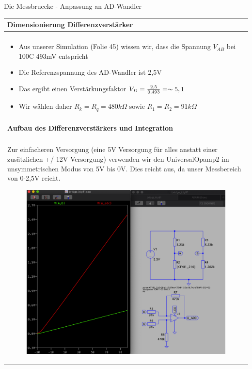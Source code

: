 \begin{frame}[t]{Die Messbruecke - Anpassung an AD-Wandler}

    \begin{spacing}{0.9} \begin{tiny}
            \begin{table}[h!]
                \begin{tabular}{p{10cm} }
                    \hline
                    \textbf{Dimensionierung Differenzverstärker}             \\
                    \hline                                                   \\
                    \begin{minipage}{\textwidth}
                        \begin{itemize}
                            \item Aus unserer Simulation (Folie 45) wissen wir, dass die Spannung $V_{AB}$ bei 100C 493mV entspricht
                            \item Die Referenzspannung des AD-Wandler ist 2,5V
                            \item Das ergibt einen Verstärkungsfaktor $V_D=\frac{2,5}{0,493}=\thicksim 5,1$
                            \item Wir wählen daher $R_k=R_q=480k\Omega$ sowie $R_1=R_2=91k\Omega$
                        \end{itemize}
                    \end{minipage}
                    \\\\
                    \hline
                    \textbf{Aufbau des Differenzverstärkers und Integration} \\
                    \hline                                                   \\
                    \begin{minipage}{\textwidth}
                        Zur einfacheren Versorgung (eine 5V Versorgung für alles anstatt einer zusätzlichen +/-12V Versorgung)
                        verwenden wir den UniversalOpamp2 im unsymmetrischen Modus von 5V bis 0V. Dies reicht aus, da unser Messbereich
                        von 0-2,5V reicht.
                        \begin{figure}
                            \centering
                            \includegraphics[width=0.5\linewidth]{pictures/diff_ampl_uadc_1.png}

\end{figure}
\end{minipage}
\end{tabular}
\end{table}
\end{tiny}
\end{spacing}
\end{frame}
